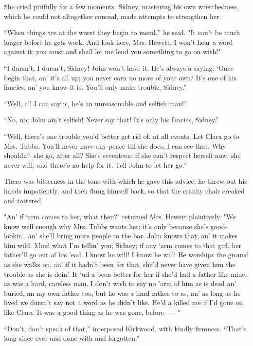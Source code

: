 She cried pitifully for a few moments. Sidney, mastering his own
wretchedness, which he could not altogether conceal, made attempts to
strengthen her.

``When things are at the worst they begin to mend,'' he said. "It can't
be much longer before he gets work. And look here, Mrs. Hewett, I won't
hear a word against it; you {\protect\hypertarget{41}{}{}}must and shall
let me lend you something to go on with!"

``I dursn't, I dursn't, Sidney! John won't have it. He's always
a-saying: `Once begin that, an' it's all up; you never earn no more of
your own.` It's one of his fancies, an' you know it is. You'll only make
trouble, Sidney.''

``Well, all I can say is, he's an unreasonable and selfish man!''

``No, no; John ain't selfish! Never say that! It's only his fancies,
Sidney.''

``Well, there's one trouble you'd better get rid of, at all events. Let
Clara go to Mrs. Tubbs. You'll never have any peace till she does, I can
see that. Why shouldn't she go, after all? She's seventeen; if she can't
respect herself now, she never will, and there's no help for it. Tell
John to let her go.''

There was bitterness in the tone with which he gave this advice; he
threw out his hands impatiently, and then flung himself back, so that
the cranky chair creaked and tottered.

{\protect\hypertarget{42}{}{}}"An' if `arm comes to her, what then?"
returned Mrs. Hewett plaintively. "We know well enough why Mrs. Tubbs
wants her; it's only because she's good-lookin', an' she'll bring more
people to the bar. John knows that, an' it makes him wild. Mind what I'm
tellin' you, Sidney; if any `arm comes to that girl, her father'll go
out of his 'ead. I know he will! I know he will! He worships the ground
as she walks on, an' if it hadn't been for that, she'd never have given
him the trouble as she is doin'. It `ud a been better for her if she'd
had a father like mine, as was a hard, careless man. I don't wish to say
no 'arm of him as is dead an' buried, an my own father too, but he was a
hard father to us, an' as long as he lived we dursn't say not a word as
he didn't like. He'd a killed me if I'd gone on like Clara. It was a
good thing as he was gone, before{{------}}"

``Don't, don't speak of that,'' interposed Kirkwood, with kindly
firmness. ``That's long since over and done with and forgotten.''

